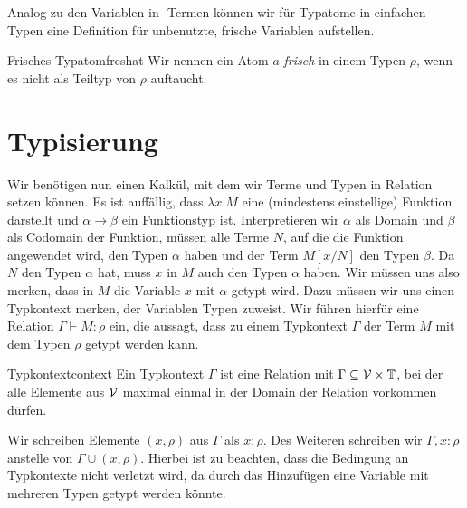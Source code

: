 Analog zu den Variablen in \tlambda-Termen können wir für Typatome in einfachen Typen eine Definition für unbenutzte, frische Variablen aufstellen.
\begin{definition}{Frisches Typatom}{freshat}
    Wir nennen ein Atom $a$ \emph{frisch} in einem Typen $\rho$, wenn es nicht als Teiltyp von $\rho$ auftaucht.
\end{definition}
\section{Typisierung}
Wir benötigen nun einen Kalkül, mit dem wir Terme und Typen in Relation setzen können. Es ist auffällig, dass $\lambda x.M$ eine (mindestens einstellige) Funktion darstellt und $\alpha\to\beta$ ein Funktionstyp ist. Interpretieren wir $\alpha$ als Domain und $\beta$ als Codomain der Funktion, müssen alle Terme $N$, auf die die Funktion angewendet wird, den Typen $\alpha$ haben und der Term $M[x/N]$ den Typen $\beta$.
Da $N$ den Typen $\alpha$ hat, muss $x$ in $M$ auch den Typen $\alpha$ haben. Wir müssen uns also merken, dass in $M$ die Variable $x$ mit $\alpha$ getypt wird. Dazu müssen wir uns einen Typkontext merken, der Variablen Typen zuweist. Wir führen hierfür eine Relation $\Gamma\vdash M:\rho$ ein, die aussagt, dass zu einem Typkontext $\Gamma$ der Term $M$ mit dem Typen $\rho$ getypt werden kann.

\begin{definition}{Typkontext}{context}
    Ein Typkontext $\Gamma$ ist eine Relation mit $\Gamma\subseteq \mathcal{V}\times\mathbb{T}$, bei der alle Elemente aus $\mathcal{V}$ maximal einmal in der Domain der Relation vorkommen dürfen.
\end{definition}
\begin{notation}
    Wir schreiben Elemente $(x,\rho)$ aus $\Gamma$ als $x : \rho$. Des Weiteren schreiben wir $\Gamma, x:\rho$ anstelle von $\Gamma\cup(x,\rho)$. Hierbei ist zu beachten, dass die Bedingung an Typkontexte nicht verletzt wird, da durch das Hinzufügen eine Variable mit mehreren Typen getypt werden könnte.
\end{notation}

